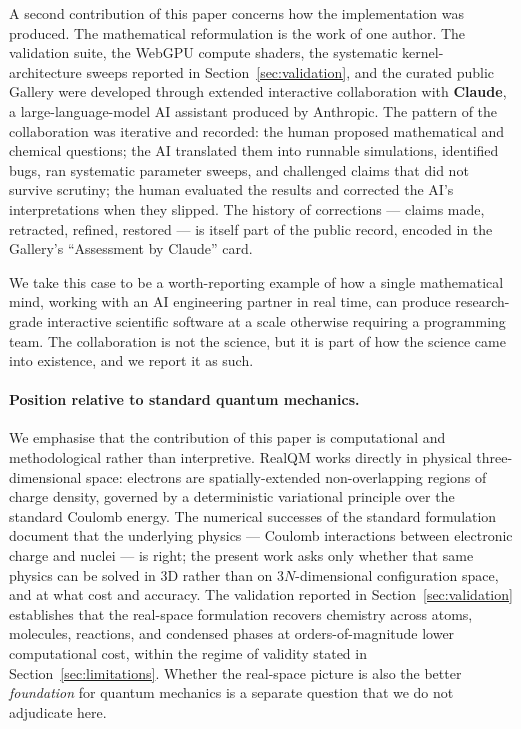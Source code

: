 \documentclass[11pt]{article}
\begin{document}
A second contribution of this paper concerns how the implementation was produced. The mathematical reformulation is the work of one author. The validation suite, the WebGPU compute shaders, the systematic kernel-architecture sweeps reported in Section~\ref{sec:validation}, and the curated public Gallery were developed through extended interactive collaboration with \textbf{Claude}, a large-language-model AI assistant produced by Anthropic. The pattern of the collaboration was iterative and recorded: the human proposed mathematical and chemical questions; the AI translated them into runnable simulations, identified bugs, ran systematic parameter sweeps, and challenged claims that did not survive scrutiny; the human evaluated the results and corrected the AI's interpretations when they slipped. The history of corrections --- claims made, retracted, refined, restored --- is itself part of the public record, encoded in the Gallery's ``Assessment by Claude'' card.

We take this case to be a worth-reporting example of how a single mathematical mind, working with an AI engineering partner in real time, can produce research-grade interactive scientific software at a scale otherwise requiring a programming team. The collaboration is not the science, but it is part of how the science came into existence, and we report it as such.

\paragraph{Position relative to standard quantum mechanics.}
We emphasise that the contribution of this paper is computational and methodological rather than interpretive. RealQM works directly in physical three-dimensional space: electrons are spatially-extended non-overlapping regions of charge density, governed by a deterministic variational principle over the standard Coulomb energy. The numerical successes of the standard formulation document that the underlying physics --- Coulomb interactions between electronic charge and nuclei --- is right; the present work asks only whether that same physics can be solved in 3D rather than on $3N$-dimensional configuration space, and at what cost and accuracy. The validation reported in Section~\ref{sec:validation} establishes that the real-space formulation recovers chemistry across atoms, molecules, reactions, and condensed phases at orders-of-magnitude lower computational cost, within the regime of validity stated in Section~\ref{sec:limitations}. Whether the real-space picture is also the better \emph{foundation} for quantum mechanics is a separate question that we do not adjudicate here.
\end{document}
